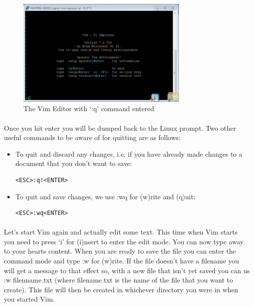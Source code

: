 \documentclass[12pt, a4paper, twoside]{book}
\begin{document}
\begin{figure}[H]
\centering
\includegraphics[width=0.75\textwidth]{images/vim_quit.png}
\caption{The Vim Editor with `:q' command entered}
\label{fig:vim-quit}
\end{figure}

\paragraph{} Once you hit enter you will be dumped back to the Linux prompt. Two other useful commands to be aware of for quitting are as follows:

\begin{itemize}
\item To quit and discard any changes, i.e. if you have already made changes to a document that you don't want to save:\\
\begin{lstlisting}[style=DOS]
    <ESC>:q!<ENTER>
\end{lstlisting}
\item To quit and save changes, we use :wq for (w)rite and (q)uit:
    \begin{lstlisting}[style=DOS]
    <ESC>:wq<ENTER>
\end{lstlisting}
\end{itemize}

\paragraph{} Let's start Vim again and actually edit some text. This time when Vim starts you need to press `i' for (i)nsert to enter the edit mode. You can now type away to your hearts content. When you are ready to save the file you can enter the command mode and type :w for (w)rite. If the file doesn't have a filename you will get a message to that effect so, with a new file that isn't yet saved you can us :w filenname.txt (where filename.txt is the name of the file that you want to create). This file will then be created in whichever directory you were in when you started Vim.
\end{document}
